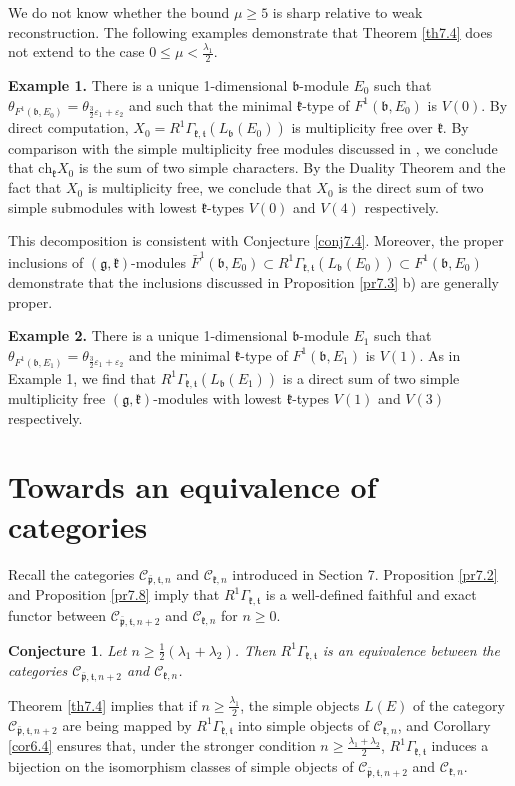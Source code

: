 \documentclass[11pt]{amsart}
\newcounter{theorem}
\newtheorem{conjecture}[theo]{Conjecture}
\renewcommand{\tt}{\mathfrak{t}}
\newcommand{\kk}{\mathfrak{k}}
\newcommand{\pp}{\mathfrak{p}}
\renewcommand{\gg}{\mathfrak{g}}
\newcommand{\bb}{\mathfrak{b}}
\newcommand{\refth}[1]{Theorem \ref{#1}}
\newcommand{\refcor}[1]{Corollary \ref{#1}}
\newcommand{\refprop}[1]{Proposition \ref{#1}}
\newcommand{\refcon}[1]{Conjecture \ref{#1}}
\begin{document}
We do not know whether the bound $\mu\geq 5$ is sharp relative to weak reconstruction. The following examples  demonstrate that \refth{th7.4} does not extend to the case $0\leq\mu <\frac{\lambda_1}{2}$.

\textbf{Example 1.} There is a unique 1-dimensional $\bb$-module $E_0$ such that $\theta_{F^1(\bb,E_0)}=\theta_{\frac{3}{2}\varepsilon_1+\varepsilon_2}$ and such that the minimal $\kk$-type of $F^1(\bb,E_0)$ is $V(0)$. By direct computation, $X_0=R^1\Gamma_{\kk,\tt}(L_\bb(E_0))$ is multiplicity free over $\kk$. By comparison with the simple multiplicity free modules discussed in \cite{PS2}, we conclude that $\mathrm{ch}_\kk X_0$ is the sum of two simple characters. By the Duality Theorem and the fact that $X_0$ is multiplicity free, we conclude that $X_0$ is the direct sum of two simple submodules with lowest $\kk$-types $V(0)$ and $V(4)$ respectively.

This decomposition is consistent with \refcon{conj7.4}. Moreover, the proper inclusions of $(\gg,\kk)$-modules $\bar{F}^1(\bb,E_0)\subset R^1\Gamma_{\kk,\tt}(L_\bb(E_0))\subset F^1(\bb,E_0)$ demonstrate that the inclusions discussed in \refprop{pr7.3} b) are generally proper. 

\textbf{Example 2.} There is a unique 1-dimensional $\bb$-module $E_1$ such that  $\theta_{F^1(\bb,E_1)}=\theta_{\frac{3}{2}\varepsilon_1+\varepsilon_2}$ and the minimal $\kk$-type of $F^1(\bb,E_1)$ is $V(1)$. As in Example 1, we find that $R^1\Gamma_{\kk,\tt}(L_\bb(E_1))$ is a direct sum of two simple multiplicity free $(\gg,\kk)$-modules with lowest $\kk$-types $V(1)$ and $V(3)$ respectively.

\section{Towards an equivalence of categories}
Recall the categories $\mathcal{C}_{\bar{\pp},\tt,n}$ and $\mathcal{C}_{\kk,n}$ introduced in Section 7.
\refprop{pr7.2} and \refprop{pr7.8} imply that $R^1\Gamma_{\kk,\tt}$ is a well-defined faithful and exact functor between $\mathcal{C}_{\bar{\pp},\tt,n+2}$ and $\mathcal{C}_{\kk,n}$ for $n\geq 0$.
\begin{conjecture}\label{con9.1}
Let $n\geq\frac{1}{2}(\lambda_1+\lambda_2)$. Then $R^1\Gamma_{\kk,\tt}$ is an equivalence between the categories $\mathcal{C}_{\bar{\pp},\tt,n+2}$ and $\mathcal{C}_{\kk,n}$.
\end{conjecture}

\refth{th7.4} implies that if $n\geq\frac{\lambda_1}{2}$, the simple objects $L(E)$ of the category $\mathcal{C}_{\bar{\pp},\tt,n+2}$ are being mapped by $R^1\Gamma_{\kk,\tt}$ into simple objects of $\mathcal{C}_{\kk,n}$, and \refcor{cor6.4} ensures that, under the stronger condition $n\geq\frac{\lambda_1+\lambda_2}{2}$, $R^1\Gamma_{\kk,\tt}$ induces a bijection on the isomorphism classes of simple objects of $\mathcal{C}_{\bar{\pp},\tt,n+2}$ and $\mathcal{C}_{\kk,n}$.
\end{document}
